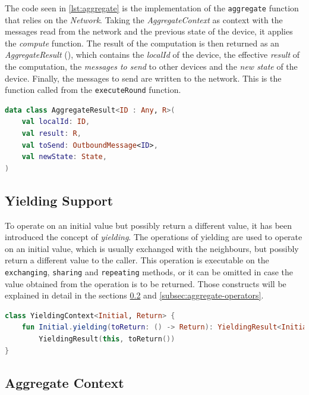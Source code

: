 The code seen in \ref{lst:aggregate} is the implementation of the \texttt{aggregate} function that relies on the \emph{Network}.
Taking the \emph{AggregateContext} as context with the messages read from the network and the previous state of the
device, it applies the \emph{compute} function.
The result of the computation is then returned as an \emph{AggregateResult} (), which contains the \emph{localId} of the device,
the effective \emph{result} of the computation, the \emph{messages to send} to other devices and the \emph{new state} of the device.
Finally, the messages to send are written to the network.
This is the function called from the \texttt{executeRound} function.

\begin{lstlisting}[language=kt,label={lst:aggregateresult}, caption={The signature of the \texttt{aggregate result}.}]
data class AggregateResult<ID : Any, R>(
    val localId: ID,
    val result: R,
    val toSend: OutboundMessage<ID>,
    val newState: State,
)
\end{lstlisting}

\subsection{Yielding Support}
\label{subsec:yielding-support}
To operate on an initial value but possibly return a different value, it has been introduced
the concept of \emph{yielding}.
The operations of yielding are used to operate on an initial value, which is usually exchanged with the neighbours,
but possibly return a different value to the caller.
This operation is executable on the \texttt{exchanging}, \texttt{sharing} and \texttt{repeating} methods, or it can be omitted
in case the value obtained from the operation is to be returned.
Those constructs will be explained in detail in the sections \ref{subsec:aggregate-context} and \ref{subsec:aggregate-operators}.

\begin{lstlisting}[language=kt,label={lst:yieldingcontext}, caption={The signature of the \texttt{yielding context} class.}]
class YieldingContext<Initial, Return> {
    fun Initial.yielding(toReturn: () -> Return): YieldingResult<Initial, Return> =
        YieldingResult(this, toReturn())
}
\end{lstlisting}

\subsection{Aggregate Context}
\label{subsec:aggregate-context}

